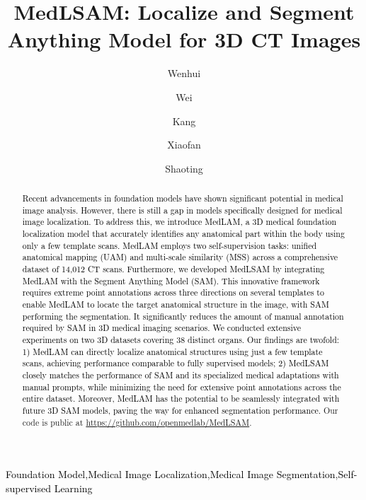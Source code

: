 \documentclass[times,twocolumn,final]{elsarticle}
\begin{document}

\begin{frontmatter}

\title{MedLSAM: Localize and Segment Anything Model for 3D CT Images}

\author[1,2]{Wenhui }
\author[3,4]{Wei }
\author[2,4]{Kang }
\author[1,2]{Xiaofan }
\author[1,2]{Shaoting }
\address[1]{School of Electronic Information and Electrical Engineering, Shanghai Jiao Tong University, Shanghai, China}
\address[2]{Shanghai AI Lab, Shanghai, China}
\address[3]{School of Biomedical Engineering, Division of Life Sciences and Medicine, University of Science and Technology of China, Hefei, China}
\address[4]{West China Biomedical Big Data Center, West China Hospital, Sichuan University, Chengdu, China}


\begin{abstract}
\textcolor{black}{Recent advancements in foundation models have shown significant potential in medical image analysis. However, there is still a gap in models specifically designed for medical image localization. To address this, we introduce MedLAM, a 3D medical foundation localization model that accurately identifies any anatomical part within the body using only a few template scans. MedLAM employs two self-supervision tasks: unified anatomical mapping (UAM) and multi-scale similarity (MSS) across a comprehensive dataset of 14,012 CT scans. Furthermore, we developed MedLSAM by integrating MedLAM with the Segment Anything Model (SAM). This innovative framework requires extreme point annotations across three directions on several templates to enable MedLAM to locate the target anatomical structure in the image, with SAM performing the segmentation. It significantly reduces the amount of manual annotation required by SAM in 3D medical imaging scenarios. We conducted extensive experiments on two 3D datasets covering 38 distinct organs. Our findings are twofold: 1) MedLAM can directly localize anatomical structures using just a few template scans, achieving performance comparable to fully supervised models; 2) MedLSAM closely matches the performance of SAM and its specialized medical adaptations with manual prompts, while minimizing the need for extensive point annotations across the entire dataset. Moreover, MedLAM has the potential to be seamlessly integrated with future 3D SAM models, paving the way for enhanced segmentation performance.} Our code is public at \href{https://github.com/openmedlab/MedLSAM}{https://github.com/openmedlab/MedLSAM}.
\end{abstract}

\begin{keyword}
\KWD \textcolor{black}{Foundation Model}\sep \textcolor{black}{Medical Image Localization}\sep \textcolor{black}{Medical Image Segmentation}\sep \textcolor{black}{Self-supervised Learning}
\end{keyword}

\end{frontmatter}
\end{document}
